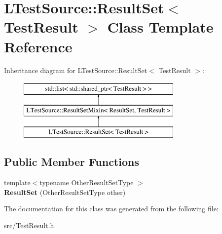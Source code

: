\hypertarget{class_l_test_source_1_1_result_set_3_01_test_result_01_4}{\section{L\-Test\-Source\-:\-:Result\-Set$<$ Test\-Result $>$ Class Template Reference}
\label{class_l_test_source_1_1_result_set_3_01_test_result_01_4}
}
Inheritance diagram for L\-Test\-Source\-:\-:Result\-Set$<$ Test\-Result $>$\-:\begin{figure}[H]
\begin{center}
\leavevmode
\includegraphics[height=3.000000cm]{class_l_test_source_1_1_result_set_3_01_test_result_01_4}
\end{center}
\end{figure}
\subsection*{Public Member Functions}
\begin{DoxyCompactItemize}
\item 
\hypertarget{class_l_test_source_1_1_result_set_3_01_test_result_01_4_aa4b1520acc21196b553c51c77afc0168}{{\footnotesize template$<$typename Other\-Result\-Set\-Type $>$ }\\{\bfseries Result\-Set} (Other\-Result\-Set\-Type other)}\label{class_l_test_source_1_1_result_set_3_01_test_result_01_4_aa4b1520acc21196b553c51c77afc0168}

\end{DoxyCompactItemize}


The documentation for this class was generated from the following file\-:\begin{DoxyCompactItemize}
\item 
src/Test\-Result.\-h\end{DoxyCompactItemize}
